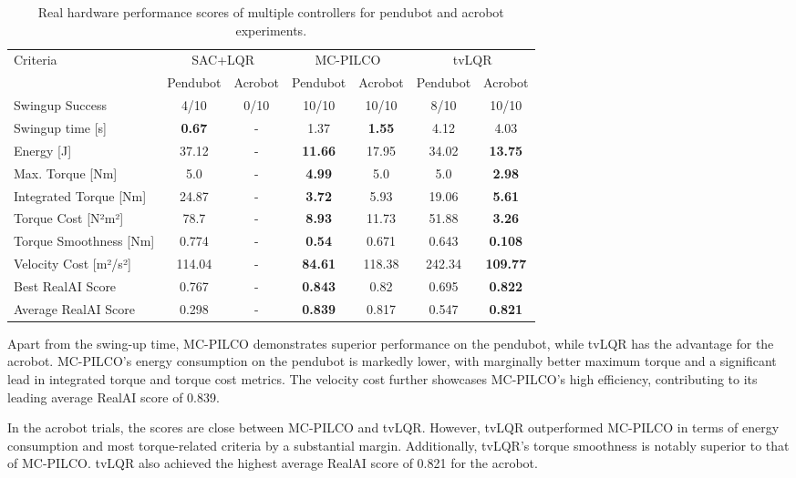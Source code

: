 \begin{table}[H]
  \centering
 \begin{tabular}{lcccccc}
 \hline
 Criteria & \multicolumn{2}{c}{SAC+LQR} & \multicolumn{2}{c}{MC-PILCO} & \multicolumn{2}{c}{tvLQR} \\
 & Pendubot & Acrobot & Pendubot & Acrobot & Pendubot & Acrobot \\
 \hline
 Swingup Success & 4/10 & 0/10 & 10/10 & 10/10 & 8/10 & 10/10 \\
 Swingup time [s] & \textbf{0.67} & - & 1.37 & \textbf{1.55} & 4.12 & 4.03 \\
 Energy [J] & 37.12 & - & \textbf{11.66} & 17.95 & 34.02 & \textbf{13.75} \\
 Max. Torque [Nm] & 5.0 & - & \textbf{4.99} & 5.0 & 5.0 & \textbf{2.98} \\
 Integrated Torque [Nm] & 24.87 & - & \textbf{3.72} & 5.93 & 19.06 & \textbf{5.61} \\
 Torque Cost [N²m²] & 78.7 & - & \textbf{8.93} & 11.73 & 51.88 & \textbf{3.26} \\
 Torque Smoothness [Nm] & 0.774 & - & \textbf{0.54} & 0.671 & 0.643 & \textbf{0.108} \\
 Velocity Cost [m²/s²] & 114.04 & - & \textbf{84.61} & 118.38 & 242.34 & \textbf{109.77} \\
 Best RealAI Score & 0.767 & - & \textbf{0.843} & 0.82 & 0.695 & \textbf{0.822} \\
 Average RealAI Score & 0.298 & - & \textbf{0.839} & 0.817 & 0.547 & \textbf{0.821} \\
 \hline
 \end{tabular}
 \caption{Real hardware performance scores of multiple controllers for pendubot and acrobot experiments.}
 \label{tab:performance_real}
\end{table}

Apart from the swing-up time, MC-PILCO demonstrates superior performance on the pendubot, while tvLQR has the advantage for the acrobot. MC-PILCO's energy consumption on the pendubot is markedly lower, with marginally better maximum torque and a significant lead in integrated torque and torque cost metrics. The velocity cost further showcases MC-PILCO's high efficiency, contributing to its leading average RealAI score of 0.839.

In the acrobot trials, the scores are close between MC-PILCO and tvLQR. However, tvLQR outperformed MC-PILCO in terms of energy consumption and most torque-related criteria by a substantial margin. Additionally, tvLQR's torque smoothness is notably superior to that of MC-PILCO. tvLQR also achieved the highest average RealAI score of 0.821 for the acrobot.

